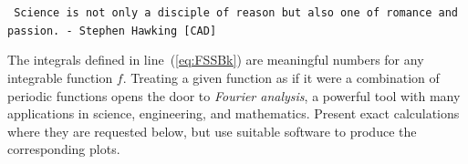 \documentclass{exam}
\newcommand\starscore[2]{%
  \pgfmathsetmacro\pgfxa{#1 + 1}%
  \tikzstyle{scorestars}=[star, star points=5, star point ratio=2.5, draw, inner sep=0.12em, anchor=outer point 3]%
  \begin{tikzpicture}[baseline=2pt]
    \foreach \i in {1, ..., #2} {
      \pgfmathparse{\i<=#1 ? "black" : "white"}
      \edef\starcolor{\pgfmathresult}
      \draw (\i*1em, 0) node[name=star\i, scorestars, fill=\starcolor, semithick]  {};
    }
    \pgfmathparse{#1>int(#1) ? int(#1+1) : 0}
    \let\partstar=\pgfmathresult
    \ifnum\partstar>0
      \pgfmathsetmacro\starpart{#1-(int(#1)}
      \path [clip] ($(star\partstar.outer point 3)!(star\partstar.outer point 2)!(star\partstar.outer point 4)$) rectangle 
      ($(star\partstar.outer point 2 |- star\partstar.outer point 1)!\starpart!(star\partstar.outer point 1 -| star\partstar.outer point 5)$);
      \fill (\partstar*1em, 0) node[scorestars, fill=black]  {};
    \fi
  \end{tikzpicture}%
}
\begin{document}
\begin{questions}
\begin{parts}
\begin{solution}
\begin{mdframed}[style=QuoteFrame]
\raggedright\texttt{%
Science is not only a disciple of reason but also one of romance and passion. - Stephen Hawking [CAD]
}
\end{mdframed}

\end{solution}
\end{parts}

\question
The integrals defined in line~(\ref{eq:FSSBk}) are meaningful numbers
for any integrable function $f$.
Treating a given function as if it were a combination of periodic
functions opens the door to \emph{Fourier analysis},
a powerful tool with many applications in science, engineering, and mathematics.
Present exact calculations where they are requested below,
but use suitable software to produce the corresponding plots.

\end{questions}
\end{document}
